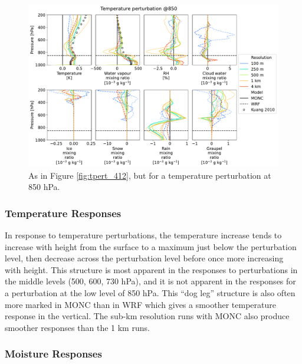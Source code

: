 \documentclass[draft]{agujournal2019}
\begin{document}
\begin{figure}[pth]
    \noindent\includegraphics[width=\textwidth]{figures/pert_diffs_T_0.5_@850}
    \caption{As in Figure \ref{fig:tpert_412}, but for a temperature
    perturbation at 850 hPa.}
    \label{fig:tpert_850}
\end{figure}

\subsubsection{Temperature Responses}

In response to temperature perturbations, the temperature increase tends to
increase with height from the surface to a maximum just below the perturbation
level, then decrease across the perturbation level before once more increasing
with height. This structure is most apparent in the responses to perturbations
in the middle levels (500, 600, 730 hPa), and it is not apparent in the
responses for a perturbation at the low level of 850 hPa. This ``dog leg''
structure is also often more marked in MONC than in WRF which gives a smoother
temperature response in the vertical. The sub-km resolution runs with MONC also
produce smoother responses than the 1 km runs.

\subsubsection{Moisture Responses}
\end{document}
